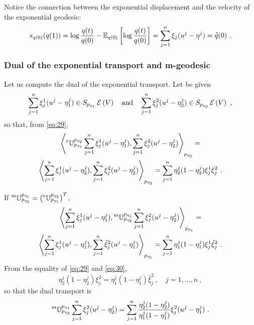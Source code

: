 \documentclass[12pt,a4paper]{amsart}
\begin{document}
Notice the connection between the exponential displacement and the velocity of the exponential geodesic:
\begin{equation}
  \label{eq:51}
  s_{q(0)}(q(1)) = \log \frac {q(t)}{q(0)} - \expectat {q(0)} {\log \frac {q(t)}{q(0)}} = \sum_{j=1}^n \xi_j(u^j - \eta^j) = \velocity q(0) \ .
\end{equation}

\subsubsection{Dual of the exponential transport and m-geodesic}
\label{sec:dual-expon-transp}
Let us compute the dual of the exponential transport. Let be given
\begin{equation}
  \label{eq:38}
  \sum_{j=1}^n \xi_j^1(u^j - \eta^j_1) \in \expfibreat {p_{\eta_1}} V \quad \text{and} \quad \sum_{j=1}^n \xi_j^2(u^j - \eta^j_2) \in \expfibreat {p_{\eta_2}} V \ ,
\end{equation}
so that, from \cref{eq:29},
\begin{multline}
  \label{eq:39}
  \scalarat {p_{\eta_2}} {\etransport {p_{\eta_1}} {p_{\eta_2}}  \sum_{j=1}^n \xi_j^1(u^j - \eta^j_1)} {\sum_{j=1}^n \xi_j^2(u^j - \eta^j_2)} = \\
   \scalarat {p_{\eta_2}} {\sum_{j=1}^n \xi_j^1(u^j - \eta^j_2)} {\sum_{j=1}^n \xi_j^2(u^j - \eta^j_2)} = 
   \sum_{j=1}^n \eta^j_2(1-\eta^j_2) \xi_j^1 \xi_j^2 \ . 
 \end{multline}

If $\prescript{\text{m}}{} {\mathbb U} _ {p_{\eta_2}} ^ {p_{\eta_1}} = \left(\prescript{\text{e}}{} {\mathbb U} _ {p_{\eta_1}} ^ {p_{\eta_2}}\right)^T$,
\begin{multline}
  \label{eq:39a}
  \scalarat {p_{\eta_1}} {\sum_{j=1}^n \xi_j^1(u^j - \eta^j_1)} {\mtransport {p_{\eta_2}} {p_{\eta_1}}\sum_{j=1}^n \xi_j^2(u^j - \eta^j_2)} = \\
   \scalarat {p_{\eta_1}} {\sum_{j=1}^n \xi_j^1(u^j - \eta^j_1)} {\sum_{j=1}^n \hat \xi_j^2(u^j - \eta^j_1)} = 
   \sum_{j=1}^n \eta^j_1(1-\eta^j_1) \xi_j^1 \hat \xi_j^2 \ . 
\end{multline}
From the equality of \cref{eq:29} and \cref{eq:30},
\begin{equation}
\eta^j_2(1-\eta^j_2) \xi_j^2 = \eta^j_1(1-\eta^j_1) \hat \xi_j^2 \ , \quad j=1,\dots,n \ ,
\end{equation}
so that the dual transport is
\begin{equation}
  \label{eq:39b}
\mtransport {p_{\eta_2}} {p_{\eta_1}} \sum_{j=1}^n \xi_j^2(u^j - \eta^j_2) = 
\sum_{j=1}^n \frac{\eta^j_2(1-\eta^j_2)} {\eta^j_1(1-\eta^j_1)} \xi_j^2 (u^j - \eta^j_1) \ .
\end{equation}
\end{document}
